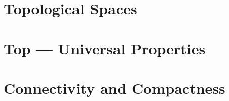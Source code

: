 \documentclass[../../../deep-dive]{subfiles}
\begin{document}
\chapter{Topological Spaces}









\chapter{\textbf{Top} --- Universal Properties}





\chapter{Connectivity and Compactness}


\end{document}
